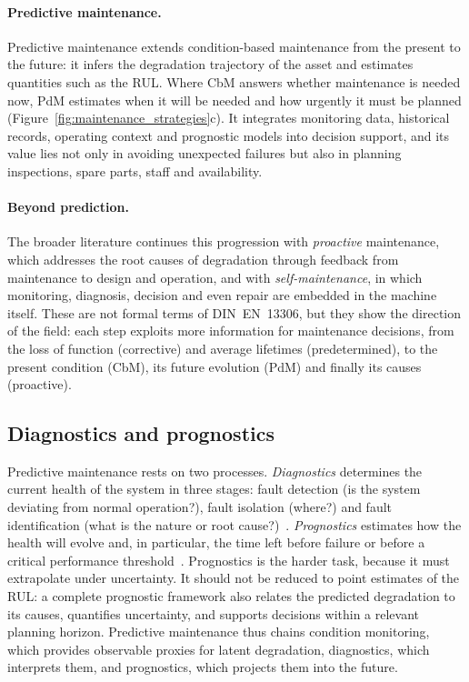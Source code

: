 \documentclass{book}
\begin{document}
\paragraph{Predictive maintenance.}
Predictive maintenance extends condition-based maintenance from the present to
the future: it infers the degradation trajectory of the asset and estimates
quantities such as the RUL. Where CbM answers whether maintenance is needed
now, PdM estimates when it will be needed and how urgently it must be planned
(Figure~\ref{fig:maintenance_strategies}c). It integrates monitoring data,
historical records, operating context and prognostic models into decision
support, and its value lies not only in avoiding unexpected failures but also
in planning inspections, spare parts, staff and availability.

\paragraph{Beyond prediction.}
The broader literature continues this progression with \emph{proactive}
maintenance, which addresses the root causes of degradation through feedback
from maintenance to design and operation, and with \emph{self-maintenance},
in which monitoring, diagnosis, decision and even repair are embedded in the
machine itself. These are not formal terms of DIN~EN~13306, but they show the
direction of the field: each step exploits more information for maintenance
decisions, from the loss of function (corrective) and average lifetimes
(predetermined), to the present condition (CbM), its future evolution (PdM)
and finally its causes (proactive).

\subsection{Diagnostics and prognostics}

Predictive maintenance rests on two processes. \emph{Diagnostics} determines
the current health of the system in three stages: fault detection (is the
system deviating from normal operation?), fault isolation (where?) and fault
identification (what is the nature or root cause?)~\cite{Lei2018}.
\emph{Prognostics} estimates how the health will evolve and, in particular,
the time left before failure or before a critical performance
threshold~\cite{Si2011RUL,Lei2018}. Prognostics is the harder task, because it
must extrapolate under uncertainty. It should not be reduced to point
estimates of the RUL: a complete prognostic framework also relates the
predicted degradation to its causes, quantifies uncertainty, and supports
decisions within a relevant planning horizon. Predictive maintenance thus
chains condition monitoring, which provides observable proxies for latent
degradation, diagnostics, which interprets them, and prognostics, which
projects them into the future.
\end{document}
